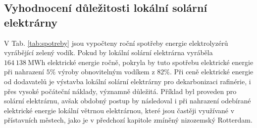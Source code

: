 \subsection{Vyhodnocení důležitosti lokální solární elektrárny}

V Tab. \ref{tab:spotreby} jsou vypočteny roční spotřeby energie elektrolyzérů vyrábějící zelený vodík. Pokud by lokální solární elektrárna vyráběla $164\ 138\ \mathrm{MWh}$ elektrické energie ročně, pokryla by tuto spotřebu elektrické energie při nahrazení $5\%$ výroby obnovitelným vodíkem z $82\%$. Při ceně elektrické energie od dodavatelů je výstavba lokální solární elektrárny pro dekarbonizaci rafinérie, i přes vysoké počáteční náklady, významně důležitá. Příklad byl proveden pro solární elektrárnu, avšak obdobný postup by následoval i při nahrazení odebírané elektrické energie lokální větrnou elektrárnou, které jsou častěji využívané v přístavních městech, jako je v předchozí kapitole zmíněný nizozemský Rotterdam.